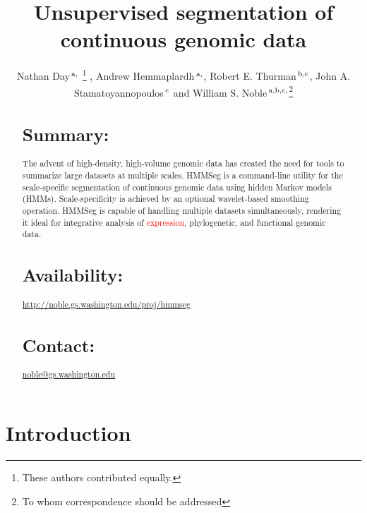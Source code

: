 \documentclass{bioinfo}
\newcommand{\footnoteremember}[2]{
  \footnote{#2} \newcounter{#1} \setcounter{#1}{\value{footnote}}}
\newcommand{\footnoterecall}[1]{\footnotemark[\value{#1}]}
\begin{document}

\title[Unsupervised segmentation of continuous genomic data]{Unsupervised
  segmentation of continuous genomic data}
\author[Day \textit{et~al}]{Nathan Day\,$^{\rm
  a,}$\footnoteremember{foot1}{These authors contributed equally.}, 
Andrew Hemmaplardh\,$^{\rm a,}$\footnoterecall{foot1},
Robert E. Thurman\,$^{\rm b,c}$, John A. Stamatoyannopoulos\,$^{\rm c}$ and
William S. Noble\,$^{\rm a,b,c,}$\footnote{To whom correspondence should be addressed}}
\address{
$^{\rm a}$Department of Computer Science and Engineering,
$^{\rm b}$Division of Medical Genetics,
$^{\rm c}$Department of Genome Sciences, University of Washington,
  Seattle, WA, USA
}
\maketitle

\begin{abstract}
\section{Summary:}
The advent of high-density, high-volume genomic data has created the
need for tools to summarize large datasets at multiple scales.  HMMSeg
is a command-line utility for the scale-specific segmentation of
continuous genomic data using hidden Markov models (HMMs).
Scale-specificity is achieved by an optional wavelet-based smoothing
operation.  HMMSeg is capable of handling multiple datasets
simultaneously, rendering it ideal for integrative analysis of
\textcolor{red}{expression}, phylogenetic, and functional genomic
data.
\section{Availability:}
\href{http://noble.gs.washington.edu/proj/hmmseg}{http://noble.gs.washington.edu/proj/hmmseg}
\section{Contact:} \href{noble@gs.washington.edu}{noble@gs.washington.edu}
\end{abstract}

\section{Introduction}
\end{document}
